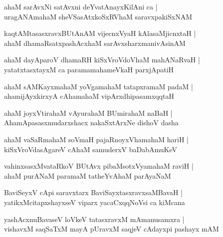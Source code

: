 \begin{shloka}
ahaM sarAvxNi satAvxni deYvatAnayxKilAni ca |\\
uragANAmahaM sheVSasAtxkoSxRVhaM saravxpakiSxNAM 
\end{shloka}

\begin{shloka}
kaqtAMtasasxravxBUtAnAM vijecnxVyaH kAlasaMjicnxtaH |\\
ahaM dhamaRsatxpashAcxhaM sarAvxsharxmanivAsinAM 
\end{shloka}

\begin{shloka}
ahaM dayAparoV dhamaRH kiSxVroVdoVhaM mahANaRvaH |\\
yatatxtasxtayxM ca paramamahameVkaH parxjApatiH 
\end{shloka}

\begin{shloka}
ahaM sAMKayxmahaM yoVgamahaM tatapxramaM padaM |\\
ahamijAyxkirxyA cAhamahaM vipArxdhipasamxqqtaH 
\end{shloka}

\begin{shloka}
ahaM joyxVtirahaM vAyurahaM BUmirahaM naBaH |\\
AhamApasasxmudarxshacx nakaSxtArxNe dishoV dasha
\end{shloka}

\begin{shloka}
ahaM vaSaRmahaM soVmaH pajaRnoyxVhamahaM hariH |\\
kiSxVroVdasAgareV cAhaM samuderxV baDabAmuKeV 
\end{shloka}

\begin{shloka}
vahinxsasxMvataRkoV BUtAvx pibaMsotxVyamahaM raviH |\\
ahaM purANaM paramaM tatheYvAhaM parAyaNaM 
\end{shloka}

\begin{shloka}
BaviSeyxV cApi saravxtarx BaviSayxtasxravxsaMBavaH |\\
yatikxMcitapxshayxseV viparx yacaCxqqNoVsi ca kiMcana 
\end{shloka}

\begin{shloka}
yashAcxnuBavaseV loVkeV tatasxravxM mAmanusamxra |\\
vishavxM saqSaTxM mayA pUravxM saqjeV cAdayxpi pashayx mAM 
\end{shloka}

